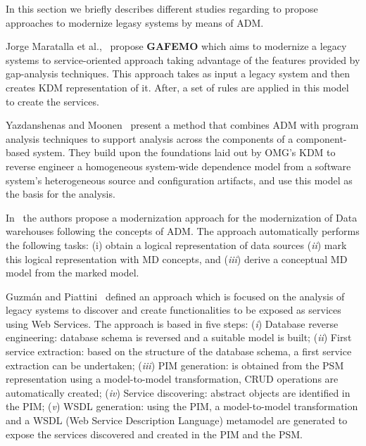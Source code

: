 In this section we briefly describes different studies regarding to propose approaches to modernize legasy systems by means of ADM.  

Jorge Maratalla et al.,~\cite{6311013} propose \textbf{GAFEMO} which aims to modernize a legacy systems to service-oriented approach taking advantage of the features provided by gap-analysis techniques. This approach takes as input a legacy system and then creates KDM representation of it. After, a set of rules are applied in this model to create the services. 


Yazdanshenas and Moonen~\cite{6080786} present a method that combines ADM with program analysis techniques to support analysis across the components of a component-based system. They build upon the foundations laid out by OMG's KDM to reverse engineer a homogeneous system-wide dependence model from a software system's heterogeneous source and configuration artifacts, and use this model as the basis for the analysis.

In~\cite{Mazon:2007:MDM:1784489.1784497} the authors propose a modernization approach for the modernization of Data warehouses following the concepts of ADM. The approach automatically performs the following tasks: (i) obtain a logical representation of data sources (\textit{ii}) mark this logical representation with MD concepts, and (\textit{iii}) derive a conceptual MD model from the marked model. 

Guzm\'{a}n and Piattini~\cite{Guzman:2007:AAR:1339262.1339532} defined an approach which is focused on the analysis of legacy systems to discover and create functionalities to be exposed as services using Web Services. The approach is based in five steps: (\textit{i}) Database reverse engineering: database schema is reversed and a suitable model is built; (\textit{ii}) First service extraction: based on the structure of the database schema, a first service extraction can be undertaken; (\textit{iii}) PIM generation: is obtained from the PSM representation using a model-to-model transformation, CRUD operations are automatically created; (\textit{iv}) Service discovering: abstract objects are identified in the PIM; (\textit{v}) WSDL generation: using the PIM, a model-to-model transformation and a WSDL (Web Service Description Language) metamodel are generated to expose the services discovered and created in the PIM and the PSM.

